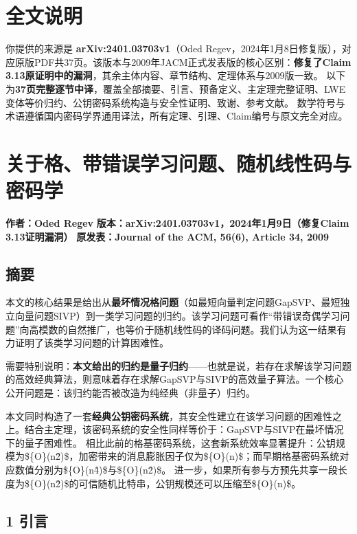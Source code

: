 
\section{全文说明}

你提供的来源是 \textbf{arXiv:2401.03703v1}（Oded Regev，2024年1月8日修复版），对应原版PDF共37页。该版本与2009年JACM正式发表版的核心区别：\textbf{修复了Claim 3.13原证明中的漏洞}，其余主体内容、章节结构、定理体系与2009版一致。 以下为\textbf{37页完整逐节中译}，覆盖全部摘要、引言、预备定义、主定理完整证明、LWE变体等价归约、公钥密码系统构造与安全性证明、致谢、参考文献。 数学符号与术语遵循国内密码学界通用译法，所有定理、引理、Claim编号与原文完全对应。

\section{关于格、带错误学习问题、随机线性码与密码学}

\textbf{作者：Oded Regev} \textbf{版本：arXiv:2401.03703v1，2024年1月9日（修复Claim 3.13证明漏洞）} \textbf{原发表：Journal of the ACM, 56(6), Article 34, 2009}

\subsection{摘要}

本文的核心结果是给出从\textbf{最坏情况格问题}（如最短向量判定问题GapSVP、最短独立向量问题SIVP）到一类学习问题的归约。该学习问题可看作“带错误奇偶学习问题”向高模数的自然推广，也等价于随机线性码的译码问题。我们认为这一结果有力证明了该类学习问题的计算困难性。

需要特别说明：\textbf{本文给出的归约是量子归约}——也就是说，若存在求解该学习问题的高效经典算法，则意味着存在求解GapSVP与SIVP的高效量子算法。一个核心公开问题是：该归约能否被改造为纯经典（非量子）归约。

本文同时构造了一套\textbf{经典公钥密码系统}，其安全性建立在该学习问题的困难性之上。结合主定理，该密码系统的安全性同样等价于：GapSVP与SIVP在最坏情况下的量子困难性。 相比此前的格基密码系统，这套新系统效率显著提升：公钥规模为\$\tilde\{O\}(n\^2)\$，加密带来的消息膨胀因子仅为\$\tilde\{O\}(n)\$；而早期格基密码系统对应数值分别为\$\tilde\{O\}(n\^4)\$与\$\tilde\{O\}(n\^2)\$。 进一步，如果所有参与方预先共享一段长度为\$\tilde\{O\}(n\^2)\$的可信随机比特串，公钥规模还可以压缩至\$\tilde\{O\}(n)\$。

\subsection{1 引言}

